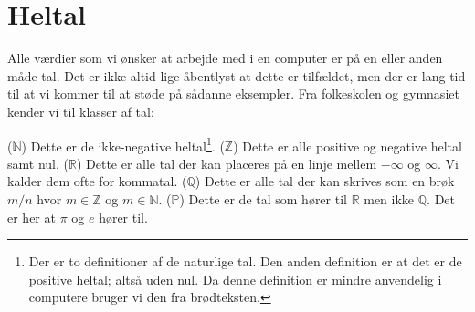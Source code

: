 \chapter{Heltal}
\label{sec:int}

Alle værdier som vi ønsker at arbejde med i en computer er på en eller anden måde tal. Det er ikke altid lige åbentlyst at dette er tilfældet, men der er lang tid til at vi kommer til at støde på sådanne eksempler. Fra folkeskolen og gymnasiet kender vi til klasser af tal:
\begin{itemize}
   ($\mathbb{N}$) Dette er de ikke-negative heltal\footnote{Der er to definitioner af de naturlige tal. Den anden definition er at det er de positive heltal; altså uden nul. Da denne definition er mindre anvendelig i computere bruger vi den fra brødteksten.}.
   ($\mathbb{Z}$) Dette er alle positive og negative heltal samt nul.
   ($\mathbb{R}$) Dette er alle tal der kan placeres på en linje mellem $-\infty$ og $\infty$. Vi kalder dem ofte for kommatal.
   ($\mathbb{Q}$) Dette er alle tal der kan skrives som en brøk $m/n$ hvor $m \in \mathbb{Z}$ og $m \in \mathbb{N}$.
   ($\mathbb{P}$) Dette er de tal som hører til $\mathbb{R}$ men ikke $\mathbb{Q}$. Det er her at $\pi$ og $e$ hører til.
\end{itemize}

